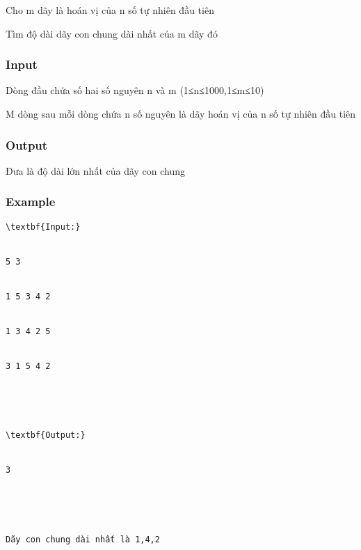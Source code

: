 



   Cho m dãy là hoán vị của n số tự nhiên đầu tiên  

   Tìm độ dài dãy con chung dài nhất của m dãy đó  

\subsubsection{   Input  }

   Dòng đầu chứa số hai số nguyên n và m (1≤n≤1000,1≤m≤10)  

   M dòng sau mỗi dòng chứa n số nguyên là dãy hoán vị của n số tự nhiên đầu tiên  

\subsubsection{   Output  }

   Đưa là độ dài lớn nhất của dãy con chung  

\subsubsection{   Example  }
\begin{verbatim}
\textbf{Input:}


5 3


1 5 3 4 2


1 3 4 2 5


3 1 5 4 2





\textbf{Output:}


3





Dãy con chung dài nhất là 1,4,2


\end{verbatim}
